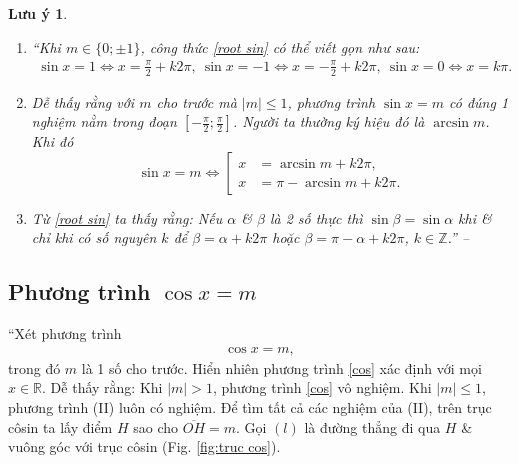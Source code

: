 \documentclass[oneside]{book}
\numberwithin{equation}{section}
\newtheorem{luuy}{Lưu ý}[section]
\begin{document}
\begin{luuy}
	\begin{enumerate}
		\item ``Khi $m\in\{0;\pm 1\}$, công thức \eqref{root sin} có thể viết gọn như sau:
		\begin{align*}
			\sin x = 1\Leftrightarrow x = \frac{\pi}{2} + k2\pi,\ \sin x = -1\Leftrightarrow x = -\frac{\pi}{2} + k2\pi,\ \sin x = 0\Leftrightarrow x = k\pi.
		\end{align*}
		\item Dễ thấy rằng với $m$ cho trước mà $|m|\le 1$, phương trình $\sin x = m$ có đúng 1 nghiệm nằm trong đoạn $\left[-\frac{\pi}{2};\frac{\pi}{2}\right]$. Người ta thường ký hiệu đó là $\arcsin m$. Khi đó
		\begin{equation*}
			\boxed{\sin x = m \Leftrightarrow\left[\begin{split}
				x &= \arcsin m + k2\pi,\\
				x &= \pi - \arcsin m + k2\pi.
			\end{split}\right.}
		\end{equation*}
		\item Từ \eqref{root sin} ta thấy rằng: Nếu $\alpha$ \& $\beta$ là 2 số thực thì $\sin\beta = \sin\alpha$ khi \& chỉ khi có số nguyên $k$ để $\beta = \alpha + k2\pi$ hoặc $\beta = \pi - \alpha + k2\pi$, $k\in\mathbb{Z}$.'' -- \cite[pp. 22--23]{SGK_Toan_11_dai_so_giai_tich_nang_cao}
	\end{enumerate}
\end{luuy}

\subsection{Phương trình $\cos x = m$}
``Xét phương trình
\begin{align*}
	\label{cos}
	\tag{cos}
	\cos x = m,
\end{align*}
trong đó $m$ là 1 số cho trước. Hiển nhiên phương trình \eqref{cos} xác định với mọi $x\in\mathbb{R}$. Dễ thấy rằng: Khi $|m| > 1$, phương trình \eqref{cos} vô nghiệm. Khi $|m|\le 1$, phương trình (II) luôn có nghiệm. Để tìm tất cả các nghiệm của (II), trên trục côsin ta lấy điểm $H$ sao cho $\overline{OH} = m$. Gọi $(l)$ là đường thẳng đi qua $H$ \& vuông góc với trục côsin (Fig. \ref{fig:truc cos}).
\end{document}

